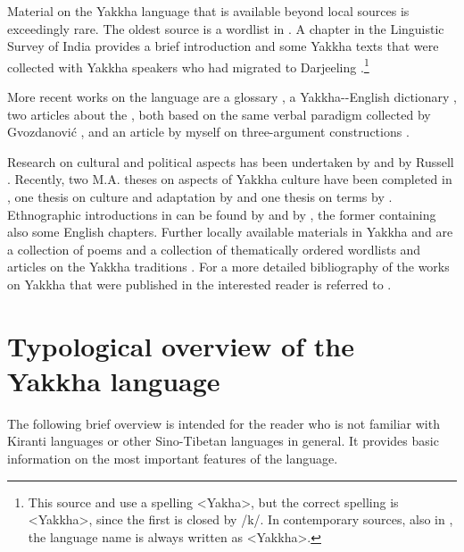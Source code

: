 Material on the Yakkha language that is available beyond local sources is exceedingly rare. The oldest source is a wordlist in \citet{Hodgson1857_Comparative}. A chapter in the Linguistic Survey of India provides a brief introduction and some Yakkha texts that were collected with Yakkha speakers who had migrated to Darjeeling \citep[305-315]{Grierson1909Linguistic}.\footnote{This source and \citet{Russell1992_Yakha} use a spelling <Yakha>, but the correct spelling is <Yakkha>, since the first  is closed by /k/. In contemporary sources, also  in , the language name is always written as <Yakkha>.} 

More recent works on the language are a  glossary \citep{Winter1996Glossary}, a Yakkha--English dictionary  \citep{Kongren2007Yakkha}, two articles about the , both based on the same verbal paradigm collected by Gvozdanović \citep{Gvozdanovic1987How, Driem1994The-Yakkha}, and an article by myself on three-argument constructions \citep{Schackow2012_Referential}.

Research on cultural and political aspects has been undertaken by \citet{Subba1999Politics} and by Russell \citet{Russell1992_Yakha, Russell1997Identity, Russell2000_Missing, Russell2004Traditions, Russell2007Writing, Russell2010_Perceptions}. Recently, two M.A. theses on aspects of Yakkha culture have been completed in , one thesis on culture and adaptation by \citet{Rai2011_Nature}  and one thesis on  terms by  \citet{Linkha2013_kinship}. Ethnographic introductions in  can be found by \citet{Kongren2007Indigenous} and by \citet{Linkha2067Yakkha}, the former containing also some English chapters. Further locally available materials in Yakkha and  are a collection of poems \citep{Dewan2001Opchyongme} and a  collection of thematically ordered wordlists and articles on the Yakkha traditions \citep{Linkha2005Yakkha}. For a more detailed bibliography of the works on Yakkha that were published in  the interested reader is referred to \cite{Rapachaetal2008Indo}. 

 

\section{Typological overview of the Yakkha language}\label{overview-yakkha}

The following brief overview is intended for the reader who is not familiar with Kiranti languages or other Sino-Tibetan languages in general. It provides basic information on the most important features of the language.


